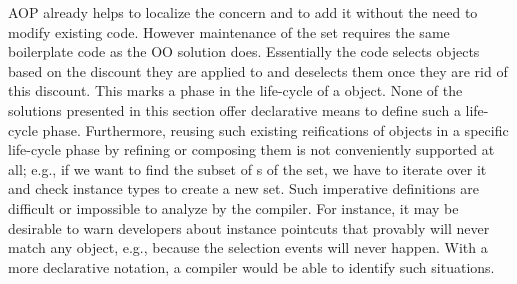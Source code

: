 AOP already helps to localize the concern and to add it without the need to modify existing code.
However maintenance of the  set requires the same boilerplate code as the OO solution does.
Essentially the code selects  objects based on the discount they are applied to and deselects them once they are rid of this discount.
This marks a phase in the life-cycle of a  object.
None of the solutions presented in this section offer declarative means to define such a life-cycle phase.
Furthermore, reusing such existing reifications of objects in a specific life-cycle phase  by refining or composing them is not conveniently supported at all;
e.g., if we want to find the subset of s of the  set, we have to iterate over it and check instance types to create a new set.
Such imperative definitions are difficult or impossible to analyze by the compiler.
For instance, it may be desirable to warn developers about instance pointcuts that provably will never match any object, e.g., because the selection events will never happen.
With a more declarative notation, a compiler would be able to identify such situations.
